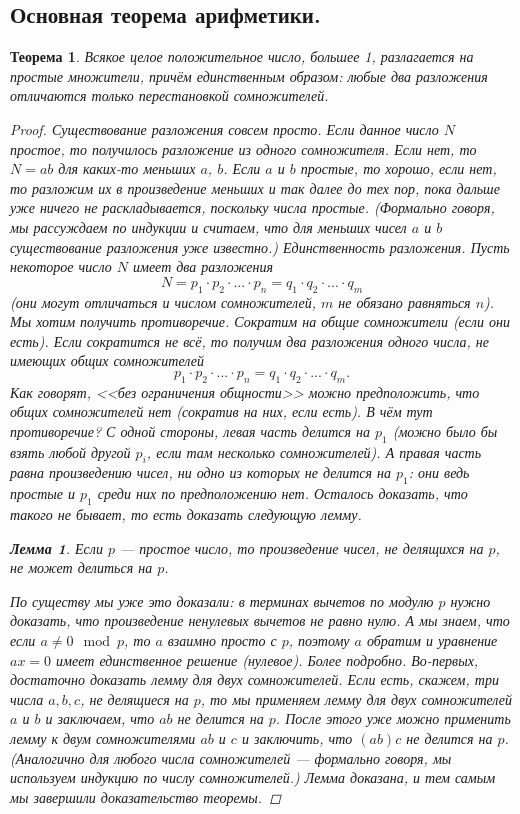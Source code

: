 \documentclass{article}
\newtheorem{theorem}{Теорема}
\newtheorem{lemma}{Лемма}
\begin{document}
\subsection{Основная теорема арифметики.}
\begin{theorem}
Всякое целое положительное число, большее 1, разлагается на простые множители, причём единственным образом: любые два разложения отличаются только перестановкой сомножителей.
\begin{proof}
\textit{Существование разложения} совсем просто. Если данное число $N$ простое, то получилось разложение из одного сомножителя. Если нет, то $N = ab$ для каких-то меньших $a$, $b$. Если $a$ и $b$ простые, то хорошо, если нет, то разложим их в произведение меньших и так далее до тех пор, пока дальше уже ничего не раскладывается, поскольку числа простые. (Формально говоря, мы рассуждаем по индукции и считаем, что для меньших чисел $a$ и $b$ существование разложения уже известно.)
\newline
\textit{Единственность разложения}. Пусть некоторое число $N$ имеет два разложения
\[
N = p_1 \cdot p_2 \cdot ... \cdot p_n = q_1 \cdot q_2 \cdot ... \cdot q_m
\]
(они могут отличаться и числом сомножителей, $m$ не обязано равняться $n$). Мы хотим получить противоречие. Сократим на общие сомножители (если они есть). Если сократится не всё, то получим два разложения одного числа, не имеющих общих сомножителей
\[
p_1 \cdot p_2 \cdot ... \cdot p_n = q_1 \cdot q_2 \cdot ... \cdot q_m.
\]
Как говорят, <<без ограничения общности>> можно предположить, что общих сомножителей нет (сократив на них, если есть).
\newline
В чём тут противоречие? С одной стороны, левая часть делится на $p_1$ (можно было бы взять любой другой $p_i$, если там несколько сомножителей). А правая часть равна произведению чисел, ни одно из которых не делится на $p_1$: они ведь простые и $p_1$ среди них по предположению нет. Осталось доказать, что такого не бывает, то есть доказать следующую лемму.
\begin{lemma}
Если $p$ — простое число, то произведение чисел, не делящихся на $p$, не может делиться на $p$.
\end{lemma}
По существу мы уже это доказали: в терминах вычетов по модулю $p$ нужно доказать, что произведение ненулевых вычетов не равно нулю. А мы знаем, что если $a \neq 0 \mod{p}$, то $a$ взаимно просто с $p$, поэтому $a$ обратим и уравнение $ax = 0$ имеет единственное решение (нулевое).
\newline
Более подробно. Во-первых, достаточно доказать лемму для двух сомножителей. Если есть, скажем, три числа $a, b, c$, не делящиеся на $p$, то мы применяем лемму для двух сомножителей $a$ и $b$ и заключаем, что $ab$ не делится на $p$. После этого уже можно применить лемму к двум сомножителями $ab$ и $c$ и заключить, что $(ab)c$ не делится на $p$. (Аналогично для любого числа сомножителей — формально говоря, мы используем индукцию по числу сомножителей.) Лемма доказана, и тем самым мы завершили доказательство теоремы.
\end{proof}
\end{theorem}
\end{document}
